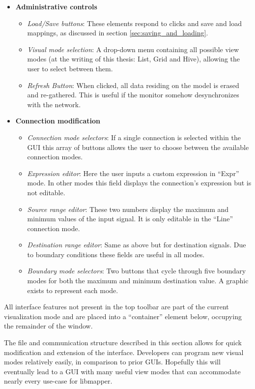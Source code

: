 \begin{itemize}
	\item \textbf{Administrative controls}
	\begin{itemize}
		\item\emph{Load/Save buttons}: These elements respond to clicks and save and load mappings, as discussed in section \ref{sec:saving_and_loading}.
		\item\emph{Visual mode selection}: A drop-down menu containing all possible view modes (at the writing of this thesis: List, Grid and Hive), allowing the user to select between them.
		\item\emph{Refresh Button}: When clicked, all data residing on the model is erased and re-gathered. This is useful if the monitor somehow desynchronizes with the network.
	\end{itemize}

	\item \textbf{Connection modification}
	\begin{itemize}
		\item\emph{Connection mode selectors}: If a single connection is selected within the GUI this array of buttons allows the user to choose between the available connection modes.
		\item\emph{Expression editor}: Here the user inputs a custom expression in ``Expr'' mode. In other modes this field displays the connection's expression but is not editable.
		\item\emph{Source range editor}: These two numbers display the maximum and minimum values of the input signal. It is only editable in the ``Line'' connection mode.
		\item\emph{Destination range editor}: Same as above but for destination signals. Due to boundary conditions these fields are useful in all modes.
		\item\emph{Boundary mode selectors}: Two buttons that cycle through five boundary modes for both the maximum and minimum destination value. A graphic exists to represent each mode.
	\end{itemize}
\end{itemize}

All interface features not present in the top toolbar are part of the current visualization mode and are placed into a ``container'' element below, occupying the remainder of the window.


The file and communication structure described in this section allows for quick modification and extension of the interface. Developers can program new visual modes relatively easily, in comparison to prior GUIs. Hopefully this will eventually lead to a GUI with many useful view modes that can accommodate nearly every use-case for libmapper.

